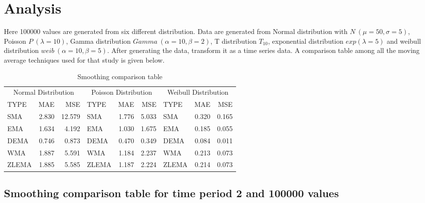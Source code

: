 \documentclass{article}
\begin{document}
\hypertarget{analysis}{%
\section{Analysis}\label{analysis}}

Here 100000 values are generated from six different distribution. Data
are generated from Normal distribution with \(N ~(\mu=50,\sigma=5)\),
Poisson \(P~(\lambda = 10)\), Gamma distribution
\(Gamma ~(\alpha = 10, \beta = 2)\), T distribution \(T_{10}\),
exponential distribution \(exp(\lambda = 5)\) and weibull distribution
\(weib~(\alpha=10, \beta =5)\). After generating the data, transform it
as a time series data. A comparison table among all the moving average
techniques used for that study is given below.

\begin{table}[H]

\caption{\label{tab:unnamed-chunk-9}Smoothing comparison table}
\centering
\begin{tabular}[t]{lrrlrrlrr}
\toprule
\multicolumn{3}{c}{Normal Distribution} & \multicolumn{3}{c}{Poisson Distribution} & \multicolumn{3}{c}{Weibull Distribution} \\
\cmidrule(l{3pt}r{3pt}){1-3} \cmidrule(l{3pt}r{3pt}){4-6} \cmidrule(l{3pt}r{3pt}){7-9}
TYPE & MAE & MSE & TYPE & MAE & MSE & TYPE & MAE & MSE\\
\midrule
SMA & 2.830 & 12.579 & SMA & 1.776 & 5.033 & SMA & 0.320 & 0.165\\
EMA & 1.634 & 4.192 & EMA & 1.030 & 1.675 & EMA & 0.185 & 0.055\\
DEMA & 0.746 & 0.873 & DEMA & 0.470 & 0.349 & DEMA & 0.084 & 0.011\\
WMA & 1.887 & 5.591 & WMA & 1.184 & 2.237 & WMA & 0.213 & 0.073\\
ZLEMA & 1.885 & 5.585 & ZLEMA & 1.187 & 2.224 & ZLEMA & 0.214 & 0.073\\
\bottomrule
\end{tabular}
\end{table}

\hypertarget{smoothing-comparison-table-for-time-period-2-and-100000-values}{%
\subsection{Smoothing comparison table for time period 2 and 100000
values}\label{smoothing-comparison-table-for-time-period-2-and-100000-values}}
\end{document}
